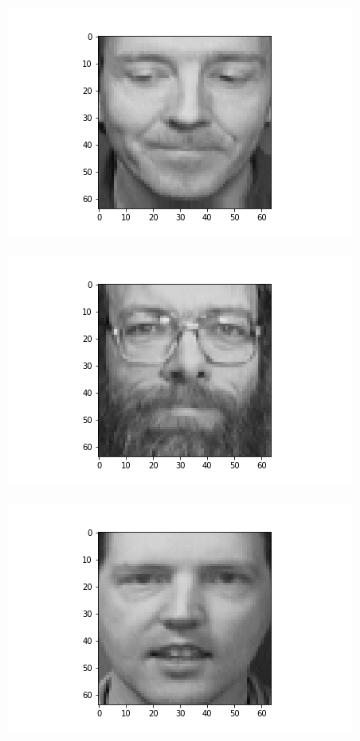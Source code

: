 \documentclass[12pt, a4paper]{article}
\begin{document}
\begin{figure}[h]
\begin{subfigure}{0.3\linewidth}
    \end{subfigure}
    \newline
    \begin{subfigure}{0.3\linewidth}
        \centering
        \includegraphics[width=\linewidth]{images/q3/c/4/6.png}
    \end{subfigure}
    \hfill
    \begin{subfigure}{0.3\linewidth}
        \centering
        \includegraphics[width=\linewidth]{images/q3/c/4/7.png}
    \end{subfigure}
    \hfill
    \begin{subfigure}{0.3\linewidth}
        \centering
        \includegraphics[width=\linewidth]{images/q3/c/4/8.png}

\end{subfigure}
\end{figure}
\end{document}

